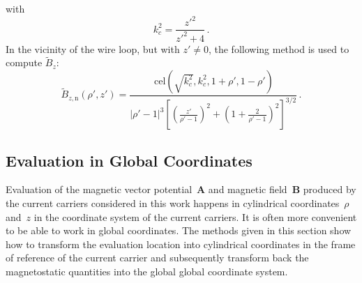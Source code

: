 with
\begin{equation}
  k_c^2 = \frac{{z'}^2}{{z'}^2 + 4} \, .
\end{equation}
In the vicinity of the wire loop, but with $z' \neq 0$,
the following method is used to compute $\tilde{B}_z$:
\begin{equation}
  \tilde{B}_{z,\mathrm{n}} (\rho', z')
  = \frac{\,\mathrm{cel}\left( \sqrt{k_c^2}, k_c^2, 1 + \rho', 1 - \rho' \right) }
         {\left|\rho' - 1 \right|^3 \left[ \left( \frac{z'}{\rho'-1} \right)^2 + \left(1 + \frac{2}{\rho'-1} \right)^2 \right]^{3/2} } \, . \label{eqn:cwl_B_z_n}
\end{equation}

\subsection{Evaluation in Global Coordinates}
Evaluation of the magnetic vector potential~$\mathbf{A}$ and magnetic field~$\mathbf{B}$
produced by the current carriers considered in this work
happens in cylindrical coordinates~$\rho$ and~$z$
in the coordinate system of the current carriers.
It is often more convenient to be able to work in global coordinates.
The methods given in this section show how to transform the evaluation location
into cylindrical coordinates in the frame of reference of the current carrier
and subsequently transform back the magnetostatic quantities into the global global coordinate system.


